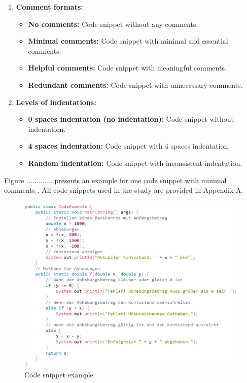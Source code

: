 \begin{enumerate}
    \item \textbf{Comment formats:}
    \begin{itemize}
        \item \textbf{No comments:} Code snippet without any comments.
        \item \textbf{Minimal comments:} Code snippet with minimal and essential comments.
        \item \textbf{Helpful comments:} Code snippet with meaningful comments.
        \item \textbf{Redundant comments:} Code snippet with unnecessary comments.
    \end{itemize}
    
    \item \textbf{Levels of indentations:}
    \begin{itemize}
        \item \textbf{0 spaces indentation (no indentation):} Code snippet without indentation.
        \item \textbf{4 spaces indentation:} Code snippet with 4 spaces indentation.
        \item \textbf{Random indentation:} Code snippet with inconsistent indentation.
    \end{itemize}
\end{enumerate}

Figure .............  presents an example for one code snippet with minimal comments . All code snippets used in the study are provided in Appendix A.


\begin{figure} [H]
  \centering
  \includegraphics[scale=0.6]{figures/code_e.png}
  \caption{Code snippet example }
  \label{fig:AnhangsChor}
\end{figure}

